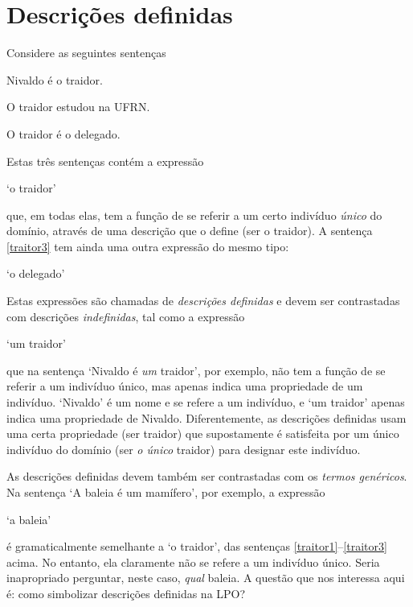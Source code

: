 \chapter{Descrições definidas}\label{subsec.defdesc}\label{c:Desdef}
Considere as seguintes sentenças
	\begin{earg}
		\item[\ex{traitor1}] Nivaldo é o traidor.
		\item[\ex{traitor2}] O traidor estudou na UFRN.
		\item[\ex{traitor3}] O traidor é o delegado.
	\end{earg}
Estas três sentenças contém a expressão
\begin{center}
	`o traidor'
\end{center}
que, em todas elas, tem a função de se referir a um certo indivíduo \emph{único} do domínio, através de uma descrição que o define (ser o traidor).
A sentença \ref{traitor3} tem ainda uma outra expressão do mesmo tipo:
\begin{center}
	`o delegado'
\end{center}
Estas expressões são chamadas de \emph{descrições definidas} e devem ser contrastadas com descrições \emph{indefinidas}, tal como a expressão
\begin{center}
	`um traidor'
\end{center}
que na sentença `Nivaldo é \emph{um} traidor', por exemplo, não tem a função de se referir a um indivíduo único, mas apenas indica uma propriedade de um indivíduo.
`Nivaldo' é um nome e se refere a um indivíduo, e `um traidor' apenas indica uma propriedade de Nivaldo. 
Diferentemente, as descrições definidas usam uma certa propriedade (ser traidor) que supostamente é satisfeita por um único indivíduo do domínio (ser \emph{o único} traidor) para designar este indivíduo.

As descrições definidas devem também ser contrastadas com os \emph{termos genéricos}.
Na sentença `A baleia é um mamífero', por exemplo, a expressão
\begin{center}
	`a baleia'
\end{center}
é gramaticalmente semelhante a `o traidor', das sentenças \ref{traitor1}--\ref{traitor3} acima. No entanto, ela claramente não se refere a um indivíduo único.
Seria inapropriado perguntar, neste caso, \emph{qual} baleia.
A questão que nos interessa aqui é: como simbolizar descrições definidas na LPO?


